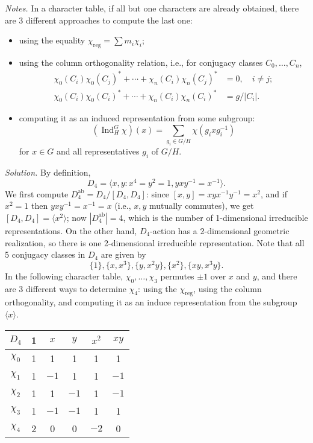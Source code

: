 \documentclass{mathproblems}
\DeclareMathOperator{\Ind}{Ind}
\begin{document}
\begin{questions}

{\color{violet}
\textit{Notes.} In a character table, if all but one characters are already obtained, there are 3 different approaches to compute the last one:
\begin{itemize}
    \item using the equality $\chi_{\operatorname{reg}}=\sum m_i \chi_i$;
    \item using the column orthogonality relation, i.e., for conjugacy classes $C_0,\ldots,C_n$,
    $$
    \begin{aligned}
    \chi_0(C_i)\chi_0(C_j)^*+\cdots+\chi_n(C_i)\chi_n(C_j)^*&=0,\quad i\neq j;\\
    \chi_0(C_i)\chi_0(C_i)^*+\cdots+\chi_n(C_i)\chi_n(C_i)^*&=g/|C_i|.
    \end{aligned}
    $$
    \item computing it as an induced representation from some subgroup:
    $$
    (\Ind_H^G \chi)(x)= \sum_{g_i\in G/H} \chi(g_i x g_i^{-1})
    $$
    for $x\in G$ and all representatives $g_i$ of $G/H$.
\end{itemize}
}

\textit{Solution.} By definition,
$$
D_4=\langle x,y: x^4=y^2=1, y x y^{-1}=x^{-1}\rangle.
$$
We first compute $D_4^{\mathrm{ab}}=D_4/[D_4,D_4]$: since $[x,y]=xyx^{-1}y^{-1}=x^2$, and if $x^2=1$ then $y x y^{-1}=x^{-1}=x$ (i.e., $x,y$ mutually commutes), we get $[D_4,D_4]=\langle x^2\rangle$; now $|D_4^{\mathrm{ab}}|=4$, which is the number of 1-dimensional irreducible representations. On the other hand, $D_4$-action has a 2-dimensional geometric realization, so there is one 2-dimensional irreducible representation. Note that all 5 conjugacy classes in $D_4$ are given by
$$
\{1\}, \{x,x^3\}, \{y, x^2 y\}, \{x^2\}, \{x y, x^3 y\}.
$$
In the following character table, $\chi_0,\ldots,\chi_3$ permutes $\pm 1$ over $x$ and $y$, and there are 3 different ways to determine $\chi_4$: using the $\chi_{\mathrm{reg}}$, using the column orthogonality, and computing it as an induce representation from the subgroup $\langle x\rangle$.
\begin{center}
\begin{tabular}{c|ccccc}
$D_4$ & 1 & $x$ & $y$ & $x^2$ & $x y$\\
\hline
$\chi_0$ & 1 & 1 & 1 & 1 & 1 \\
$\chi_1$ & 1 & $-1$ & 1 & 1 & $-1$ \\
$\chi_2$ & 1 & 1 & $-1$ & 1 & $-1$ \\
$\chi_3$ & 1 & $-1$ & $-1$ & 1 & 1 \\
$\chi_4$ & 2 & 0 & 0 & $-2$ & 0 \\
\end{tabular}
\end{center}


\end{questions}
\end{document}
